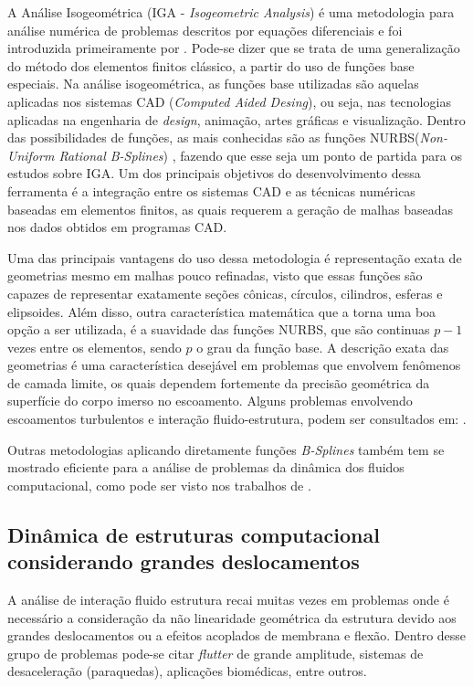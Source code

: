 \documentclass[tese_patricia.tex]{subfiles}
\begin{document}
A Análise Isogeométrica (IGA - \textit{Isogeometric Analysis}) é uma metodologia para análise numérica de problemas descritos por equações diferenciais e foi introduzida primeiramente por . Pode-se dizer que se trata de uma generalização do método dos elementos finitos clássico, a partir do uso de funções base especiais. Na análise isogeométrica, as funções base utilizadas são aquelas aplicadas nos sistemas CAD (\textit{Computed Aided Desing}), ou seja, nas tecnologias aplicadas na engenharia de \textit{design}, animação, artes gráficas e visualização.  Dentro das possibilidades de funções, as mais conhecidas são as funções NURBS(\textit{Non-Uniform Rational B-Splines}) \cite{PiegT:1996}, fazendo que esse seja um ponto de partida para os estudos sobre IGA. Um dos principais objetivos do desenvolvimento dessa ferramenta é a integração entre os sistemas CAD e as técnicas numéricas baseadas em elementos finitos, as quais requerem a geração de malhas baseadas nos dados obtidos em programas CAD. 

Uma das principais vantagens do uso dessa metodologia é representação exata de geometrias mesmo em malhas pouco refinadas, visto que essas funções são capazes de representar exatamente seções cônicas, círculos, cilindros, esferas e elipsoides. Além disso, outra característica matemática que a torna uma boa opção a ser utilizada, é a suavidade das funções NURBS, que são continuas $p-1$ vezes entre os elementos, sendo $p$ o grau da função base. A descrição exata das geometrias é uma característica desejável em problemas que envolvem fenômenos de camada limite, os quais dependem fortemente da precisão geométrica da superfície do corpo imerso no escoamento. Alguns problemas envolvendo escoamentos turbulentos e interação fluido-estrutura, podem ser consultados em: .

Outras metodologias aplicando diretamente funções \textit{B-Splines} também tem se mostrado eficiente para a análise de problemas da dinâmica dos fluidos computacional, como pode ser visto nos trabalhos de .


\subsection{Dinâmica de estruturas computacional considerando grandes deslocamentos}
\label{csdsection}

A análise de interação fluido estrutura recai muitas vezes em problemas onde é necessário a consideração da não linearidade geométrica da estrutura devido aos grandes deslocamentos ou a efeitos acoplados de membrana e flexão. Dentro desse grupo de problemas pode-se citar \textit{flutter} de grande amplitude, sistemas de desaceleração (paraquedas), aplicações biomédicas, entre outros.
\end{document}

